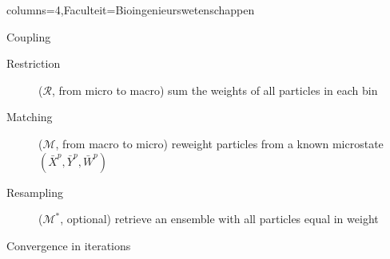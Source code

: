 \documentclass[landscape,a0paper,fontscale=0.45]{kuleuvenposter}
\begin{document}
\begin{poster}{columns=4,Faculteit=Bioingenieurswetenschappen}
\begin{posterbox}[name=macroscopic, column=1,row=0, above=parareal micro-macro]{Coupling}
\begin{description}
\item[Restriction]($\mathcal{R}$, from micro to macro) sum the weights of all particles in each bin
\item[Matching]($\mathcal{M}$, from macro to micro) reweight particles from a known microstate $(\bar{X}^p, \bar{Y}^p, \bar{W}^p)$
\item[Resampling]($\mathcal{M}^*$, optional) retrieve an ensemble with all particles equal in weight
\end{description}
\end{posterbox}

\begin{posterbox}[name=convergenceK, column=2, below=notset, above=bottom, borderColor=KULeuvenFaculteit]{Convergence in iterations}%
\end{posterbox}


\end{poster}
\end{document}
